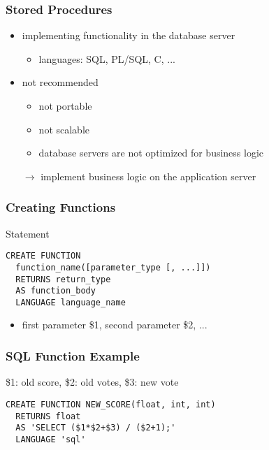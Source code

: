\documentclass[dvipsnames]{beamer}
\theoremstyle{plain}
\begin{document}
\begin{frame}
  \frametitle{Stored Procedures}

  \begin{itemize}
    \item implementing functionality in the database server
    \begin{itemize}
      \item languages: SQL, PL/SQL, C, ...
    \end{itemize}

    \pause
    \bigskip
    \item \alert{not recommended}
    \begin{itemize}
      \item not portable
      \item not scalable
      \item database servers are not optimized for business logic
    \end{itemize}
    $\rightarrow$ implement business logic on the application server
  \end{itemize}
\end{frame}

\begin{frame}[fragile]
  \frametitle{Creating Functions}

  \begin{block}{Statement}
    \begin{lstlisting}
CREATE FUNCTION
  function_name([parameter_type [, ...]])
  RETURNS return_type
  AS function_body
  LANGUAGE language_name
    \end{lstlisting}
  \end{block}

  \begin{itemize}
    \item first parameter \$1, second parameter \$2, ...
  \end{itemize}
\end{frame}

\begin{frame}[fragile]
  \frametitle{SQL Function Example}

  \begin{example}
    \$1: old score, \$2: old votes, \$3: new vote
    \begin{lstlisting}
CREATE FUNCTION NEW_SCORE(float, int, int)
  RETURNS float
  AS 'SELECT ($1*$2+$3) / ($2+1);'
  LANGUAGE 'sql'
    \end{lstlisting}
  \end{example}
\end{frame}
\end{document}
